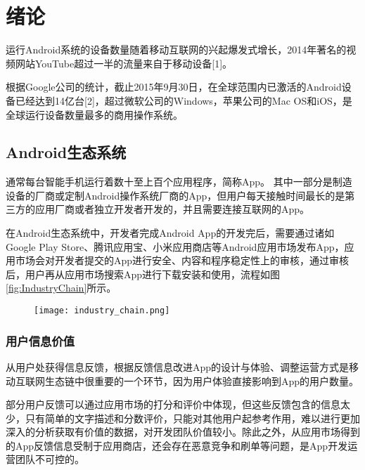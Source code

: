 
\chapter{绪论}
\label{chap:intro}

运行Android系统的设备数量随着移动互联网的兴起爆发式增长，2014年著名的视频网站YouTube超过一半的流量来自于移动设备[1]。

根据Google公司的统计，截止2015年9月30日，在全球范围内已激活的Android设备已经达到14亿台[2]，超过微软公司的Windows，苹果公司的Mac OS和iOS，是全球运行设备数量最多的商用操作系统。

\section{Android生态系统}
\label{sec:android_ecosystem}

通常每台智能手机运行着数十至上百个应用程序，简称App。
其中一部分是制造设备的厂商或定制Android操作系统厂商的App，但用户每天接触时间最长的是第三方的应用厂商或者独立开发者开发的，并且需要连接互联网的App。

在Android生态系统中，开发者完成Android App的开发完后，需要通过诸如Google Play Store、腾讯应用宝、小米应用商店等Android应用市场发布App，应用市场会对开发者提交的App进行安全、内容和程序稳定性上的审核，通过审核后，用户再从应用市场搜索App进行下载安装和使用，流程如图\ref{fig:IndustryChain}所示。

\begin{figure}[!htp]
	\centering
	\texttt{[image: industry\_chain.png]}
\end{figure}

\subsection{用户信息价值}

从用户处获得信息反馈，根据反馈信息改进App的设计与体验、调整运营方式是移动互联网生态链中很重要的一个环节，因为用户体验直接影响到App的用户数量。

部分用户反馈可以通过应用市场的打分和评价中体现，但这些反馈包含的信息太少，只有简单的文字描述和分数评价，只能对其他用户起参考作用，难以进行更加深入的分析获取有价值的数据，对开发团队价值较小。除此之外，从应用市场得到的App反馈信息受制于应用商店，还会存在恶意竞争和刷单等问题，是App开发运营团队不可控的。


